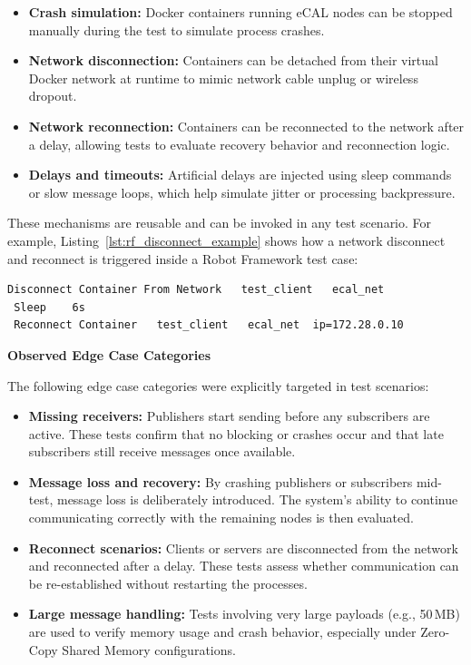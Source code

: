 \begin{itemize}
	\item \textbf{Crash simulation:} Docker containers running eCAL nodes can be stopped manually during the test to simulate process crashes.
	\item \textbf{Network disconnection:} Containers can be detached from their virtual Docker network at runtime to mimic network cable unplug or wireless dropout.
	\item \textbf{Network reconnection:} Containers can be reconnected to the network after a delay, allowing tests to evaluate recovery behavior and reconnection logic.
	\item \textbf{Delays and timeouts:} Artificial delays are injected using sleep commands or slow message loops, which help simulate jitter or processing backpressure.
\end{itemize}

These mechanisms are reusable and can be invoked in any test scenario. For example, Listing~\ref{lst:rf_disconnect_example} shows how a network disconnect and reconnect is triggered inside a Robot Framework test case:

\vspace{0.5em}
\begin{lstlisting}[style=cppstyle, caption={Simulating a temporary network disconnect and reconnect}, label={lst:rf_disconnect_example}, captionpos=b]
 Disconnect Container From Network   test_client   ecal_net
 Sleep    6s
 Reconnect Container   test_client   ecal_net  ip=172.28.0.10
\end{lstlisting}

\vspace{1em}
\textbf{Observed Edge Case Categories}

\vspace{0.4em}
The following edge case categories were explicitly targeted in test scenarios:

\begin{itemize}
	\item \textbf{Missing receivers:} Publishers start sending before any subscribers are active. These tests confirm that no blocking or crashes occur and that late subscribers still receive messages once available.
	
	\item \textbf{Message loss and recovery:} By crashing publishers or subscribers mid-test, message loss is deliberately introduced. The system’s ability to continue communicating correctly with the remaining nodes is then evaluated.
	
	\item \textbf{Reconnect scenarios:} Clients or servers are disconnected from the network and reconnected after a delay. These tests assess whether communication can be re-established without restarting the processes.
	
	\item \textbf{Large message handling:} Tests involving very large payloads (e.g., 50\,MB) are used to verify memory usage and crash behavior, especially under Zero-Copy Shared Memory configurations.
\end{itemize}

